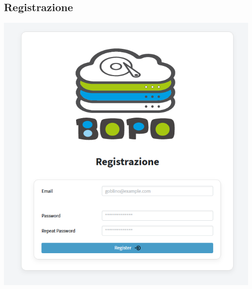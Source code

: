 \subsection*{Registrazione}
{}
\vspace{3cm}
\begin{adjustwidth}{-0.5cm}{0cm}
\includegraphics[scale=0.85]{figs/registrazione.png}
\end{adjustwidth}
\pagecolor{background}\afterpage{\nopagecolor}


